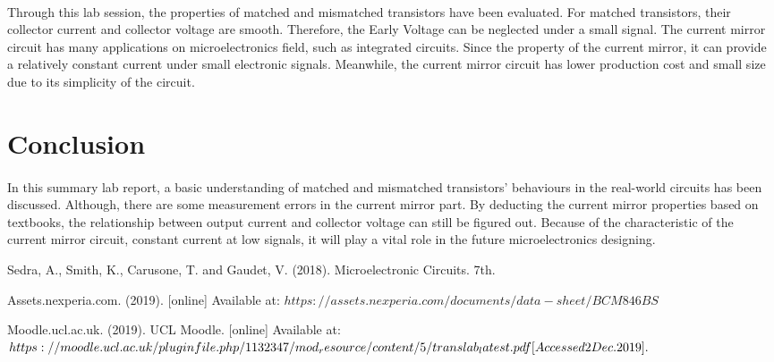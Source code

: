 \documentclass[12pt]{article}
\begin{document}
    \paragraph{}
    Through this lab session, the properties of matched and mismatched transistors have been evaluated. For matched transistors, their collector current and collector voltage are smooth. Therefore, the Early Voltage can be neglected under a small signal. The current mirror circuit has many applications on microelectronics field, such as integrated circuits. Since the property of the current mirror, it can provide a relatively constant current under small electronic signals. Meanwhile, the current mirror circuit has lower production cost and small size due to its simplicity of the circuit.
    
    
    
    
    \section{Conclusion}
    \paragraph{}
    In this summary lab report, a basic understanding of matched and mismatched transistors' behaviours in the real-world circuits has been discussed. Although, there are some measurement errors in the current mirror part. By deducting the current mirror properties based on textbooks, the relationship between output current and collector voltage can still be figured out. Because of the characteristic of the current mirror circuit, constant current at low signals, it will play a vital role in the future microelectronics designing.
    
    
    
    
    
    
    
    
    
    
    
    \newpage   
    \begin{thebibliography}{}
    Sedra, A., Smith, K., Carusone, T. and Gaudet, V. (2018). Microelectronic Circuits. 7th.
    
    Assets.nexperia.com. (2019). [online] Available at: $https://assets.nexperia.com/documents/data-sheet/BCM846BS$
    
    Moodle.ucl.ac.uk. (2019). UCL Moodle. [online] Available at: $https://moodle.ucl.ac.uk/pluginfile.php/1132347/mod_resource/content/5/ \\ translab_latest.pdf [Accessed 2 Dec. 2019].$
      
      
      
    \end{thebibliography}
    
\end{document}
